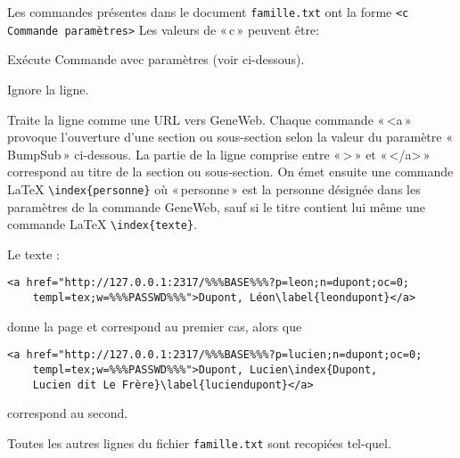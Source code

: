 Les commandes \gwtol{} présentes dans le document \verb|famille.txt| ont la forme
\verb|<c Commande paramètres>|
Les valeurs de «\,c\,» peuvent être:
\begin{description}[style=nextline]
\item[x] Exécute Commande avec paramètres (voir ci-dessous).
\item[y] Ignore la ligne.
\item[a] Traite la ligne comme une URL vers GeneWeb.
Chaque commande «\,<a\,» provoque l'ouverture d'une section ou sous-section selon
la valeur du paramètre «\,BumpSub\,» ci-dessous. La partie de la ligne comprise entre
«\,>\,» et «\,</a>\,» correspond au titre de la section ou sous-section.
On émet ensuite une commande \LaTeX{} \verb|\index{personne}| où «\,personne\,» est
la personne désignée dans les paramètres de la commande GeneWeb, sauf si le
titre contient lui même une commande \LaTeX{} \verb|\index{texte}|.

Le texte :
\begin{verbatim}
<a href="http://127.0.0.1:2317/%%%BASE%%%?p=leon;n=dupont;oc=0;
    templ=tex;w=%%%PASSWD%%%">Dupont, Léon\label{leondupont}</a>
\end{verbatim}
donne la page \pageref{leondupont} et correspond au premier cas, alors que
\begin{verbatim}
<a href="http://127.0.0.1:2317/%%%BASE%%%?p=lucien;n=dupont;oc=0;
    templ=tex;w=%%%PASSWD%%%">Dupont, Lucien\index{Dupont,
    Lucien dit Le Frère}\label{luciendupont}</a>
\end{verbatim}
correspond au second.
\end{description}
Toutes les autres lignes du fichier \verb|famille.txt| sont recopiées tel-quel.

